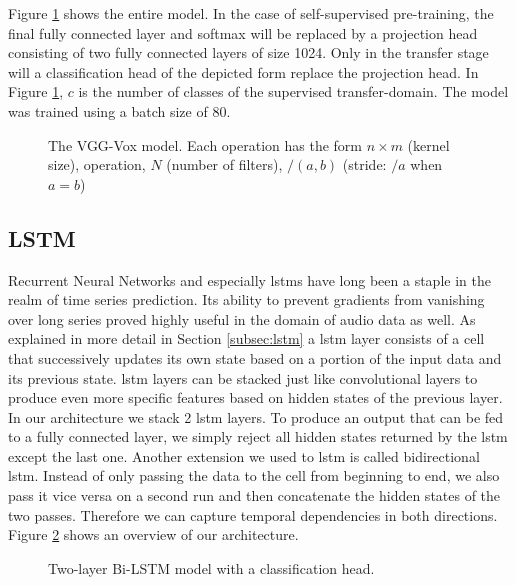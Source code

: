 Figure \ref{fig:vggvox_model} shows the entire model. In the case of self-supervised pre-training, the final fully connected layer and softmax will be replaced by a projection head consisting of two fully connected layers of size 1024. Only in the transfer stage will a classification head of the depicted form replace the projection head. In Figure \ref{fig:vggvox_model}, $c$ is the number of classes of the supervised transfer-domain. The model was trained using a batch size of $80$.

\begin{figure}[h!]
    \centering
    
    \caption[VGG-Vox Model]{The VGG-Vox model. Each operation has the form $n \times m$ (kernel size), operation, $N$ (number of filters), $/(a,b)$ (stride: $/a$ when $a = b$) }
    \label{fig:vggvox_model}
\end{figure}

\newpage

\subsection{LSTM}

Recurrent Neural Networks and especially \glspl{lstm} have long been a staple in the realm of time series prediction. Its ability to prevent gradients from vanishing over long series proved highly useful in the domain of audio data as well. As explained in more detail in Section \ref{subsec:lstm} a \gls{lstm} layer consists of a cell that successively updates its own state based on a portion of the input data and its previous state. \gls{lstm} layers can be stacked just like convolutional layers to produce even more specific features based on hidden states of the previous layer. In our architecture we stack 2 \gls{lstm} layers. To produce an output that can be fed to a fully connected layer, we simply reject all hidden states returned by the \gls{lstm} except the last one. Another extension we used to \gls{lstm} is called bidirectional \gls{lstm}. Instead of only passing the data to the cell from beginning to end, we also pass it vice versa on a second run and then concatenate the hidden states of the two passes. Therefore we can capture temporal dependencies in both directions. Figure \ref{fig:lstm} shows an overview of our architecture.

\begin{figure}[!h]
    \centering
    
    \caption[LSTM Model]{Two-layer Bi-LSTM model with a classification head.}
    \label{fig:lstm}
\end{figure}

